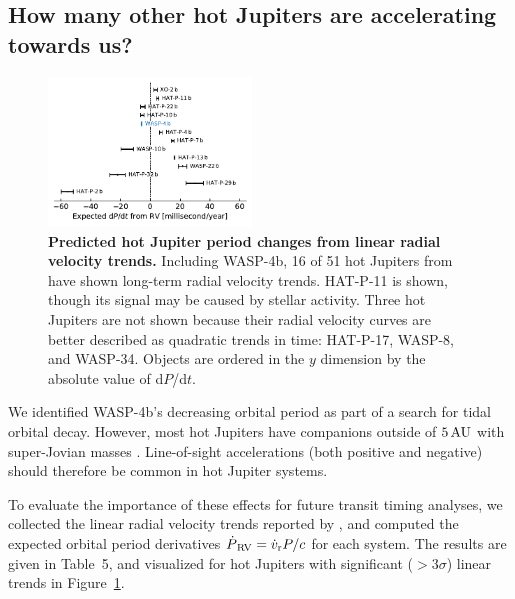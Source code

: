 \documentclass[12pt,twocolumn,tighten]{aastex62}
\begin{document}
\subsection{How many other hot Jupiters are accelerating towards us?}

\begin{figure}[t]
	\begin{center}
		\leavevmode
		\includegraphics[width=0.48\textwidth]{f5.pdf}
	\end{center}
	\vspace{-0.4cm}
	\caption{
  {\bf Predicted hot Jupiter period changes from linear radial
  velocity trends.} Including WASP-4b, 16 of 51 hot Jupiters from
  \citet{knutson_friends_2014} have shown long-term radial velocity
  trends.  HAT-P-11 is shown, though its signal may be caused by
  stellar activity.  Three hot Jupiters are not shown because their
  radial velocity curves are better described as quadratic trends in
  time: HAT-P-17, WASP-8, and WASP-34.  Objects are ordered in the $y$
  dimension by the absolute value of d$P$/d$t$.
	\label{fig:pdot_pop}
  \vspace{-0.3cm}
	}
\end{figure}

We identified WASP-4b's decreasing orbital period as part of a search
for tidal orbital decay.  However, most hot Jupiters have companions
outside of $5\,{\rm AU}$ with super-Jovian masses
\citep{knutson_friends_2014,bryan_statistics_2016}.  Line-of-sight
accelerations (both positive and negative) should therefore be common
in hot Jupiter systems. 

To evaluate the importance of these effects for future transit timing
analyses, we collected the linear radial velocity trends reported by
\citet{knutson_friends_2014}, and computed the expected orbital period
derivatives $\dot{P}_{\rm\,RV} = \dot{v}_{\rm r} P/c$ for each system.
The results are given in Table~5, and visualized for hot Jupiters with
significant ($>$$3\sigma$) linear trends in Figure~\ref{fig:pdot_pop}.
\end{document}
